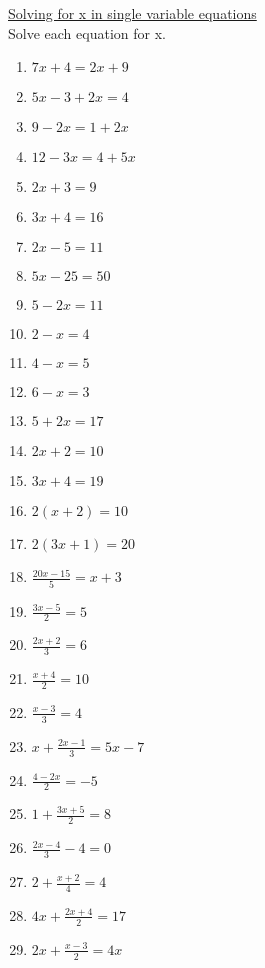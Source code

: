 \documentclass{article}
\begin{document}
\newpage
\underline{Solving for x in single variable equations}\\
Solve each equation for x.
\begin{enumerate}
\item $7x+4=2x+9$
\item $5x-3+2x=4$
\item $9-2x=1+2x$
\item $12-3x=4+5x$
\item $2x+3=9$
\item $3x+4=16$
\item $2x-5=11$
\item $5x-25=50$
\item $5-2x=11$
\item $2-x=4$
\item $4-x=5$
\item $6-x=3$
\item $5+2x=17$
\item $2x+2=10$
\item $3x+4=19$
\item $2(x+2)=10$
\item $2(3x+1)=20$
\item {\Large $\frac{20x-15}{5}=x+3$}
\item {\Large $\frac{3x-5}{2}=5$}
\item {\Large $\frac{2x+2}{3}=6$}
\item {\Large $\frac{x+4}{2}=10$}
\item {\Large $\frac{x-3}{3}=4$}
\item {\Large $x+\frac{2x-1}{3}=5x-7$}
\item {\Large $\frac{4-2x}{2}=-5$}
\item {\Large $1+\frac{3x+5}{2}=8$}
\item {\Large $\frac{2x-4}{3}-4=0$}
\item {\Large $2+\frac{x+2}{4}=4$}
\item {\Large $4x+\frac{2x+4}{2}=17$}
\item {\Large $2x+\frac{x-3}{2}=4x$}

\end{enumerate}
\end{document}
